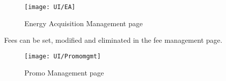 \begin{figure} [H]
	\begin{center}
		\texttt{[image: UI/EA]}
		\caption{Energy Acquisition Management page}
		\label{fig: cd}
	\end{center}
\end{figure}

Fees can be set, modified and eliminated in the fee management page.

\begin{figure} [H]
	\begin{center}
		\texttt{[image: UI/Promomgmt]}
		\caption{Promo Management page}
		\label{fig: cd}
	\end{center}
\end{figure}